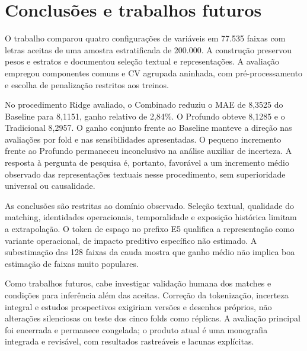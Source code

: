 \chapter{Conclusões e trabalhos futuros}\label{cap:conclusoes}
O trabalho comparou quatro configurações de variáveis em 77.535 faixas com letras aceitas de uma amostra estratificada de 200.000. A construção preservou pesos e estratos e documentou seleção textual e representações. A avaliação empregou componentes comuns e CV agrupada aninhada, com pré-processamento e escolha de penalização restritos aos treinos.

No procedimento Ridge avaliado, o Combinado reduziu o MAE de 8,3525 do Baseline para 8,1151, ganho relativo de 2,84\%. O Profundo obteve 8,1285 e o Tradicional 8,2957. O ganho conjunto frente ao Baseline manteve a direção nas avaliações por fold e nas sensibilidades apresentadas. O pequeno incremento frente ao Profundo permaneceu inconclusivo na análise auxiliar de incerteza. A resposta à pergunta de pesquisa é, portanto, favorável a um incremento médio observado das representações textuais nesse procedimento, sem superioridade universal ou causalidade.

As conclusões são restritas ao domínio observado. Seleção textual, qualidade do matching, identidades operacionais, temporalidade e exposição histórica limitam a extrapolação. O token de espaço no prefixo E5 qualifica a representação como variante operacional, de impacto preditivo específico não estimado. A subestimação das 128 faixas da cauda mostra que ganho médio não implica boa estimação de faixas muito populares.

Como trabalhos futuros, cabe investigar validação humana dos matches e condições para inferência além das aceitas. Correção da tokenização, incerteza integral e estudos prospectivos exigiriam versões e desenhos próprios, não alterações silenciosas ou teste dos cinco folds como réplicas. A avaliação principal foi encerrada e permanece congelada; o produto atual é uma monografia integrada e revisável, com resultados rastreáveis e lacunas explícitas.

